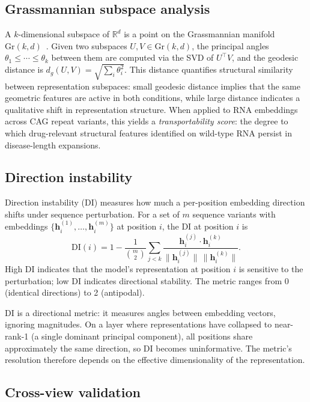 \documentclass[11pt]{article}
\newcommand{\Gr}{\mathrm{Gr}}
\newcommand{\R}{\mathbb{R}}
\begin{document}
\subsection{Grassmannian subspace analysis}

A $k$-dimensional subspace of $\R^d$ is a point on the Grassmannian
manifold $\Gr(k, d)$~\citep{edelman1998}. Given two subspaces
$U, V \in \Gr(k, d)$, the principal angles
$\theta_1 \leq \cdots \leq \theta_k$ between them are computed via the
SVD of $U^\top V$, and the geodesic distance is
$d_g(U, V) = \sqrt{\sum_i \theta_i^2}$.
%
This distance quantifies structural similarity between representation
subspaces: small geodesic distance implies that the same geometric
features are active in both conditions, while large distance indicates
a qualitative shift in representation structure.
%
When applied to RNA embeddings across CAG repeat variants, this yields
a \emph{transportability score}: the degree to which drug-relevant
structural features identified on wild-type RNA persist in disease-length
expansions.


\subsection{Direction instability}

Direction instability (DI) measures how much a per-position embedding
direction shifts under sequence perturbation. For a set of $m$ sequence
variants with embeddings $\{\mathbf{h}_i^{(1)}, \ldots,
\mathbf{h}_i^{(m)}\}$ at position $i$, the DI at position $i$ is
\[
  \mathrm{DI}(i) = 1 - \frac{1}{\binom{m}{2}} \sum_{j < k}
  \frac{\mathbf{h}_i^{(j)} \cdot \mathbf{h}_i^{(k)}}
       {\|\mathbf{h}_i^{(j)}\| \, \|\mathbf{h}_i^{(k)}\|}.
\]
High DI indicates that the model's representation at position $i$ is
sensitive to the perturbation; low DI indicates directional stability.
The metric ranges from 0 (identical directions) to 2 (antipodal).

DI is a directional metric: it measures angles between embedding
vectors, ignoring magnitudes. On a layer where representations have
collapsed to near-rank-1 (a single dominant principal component), all
positions share approximately the same direction, so DI becomes
uninformative. The metric's resolution therefore depends on the
effective dimensionality of the representation.

\subsection{Cross-view validation}
\end{document}
